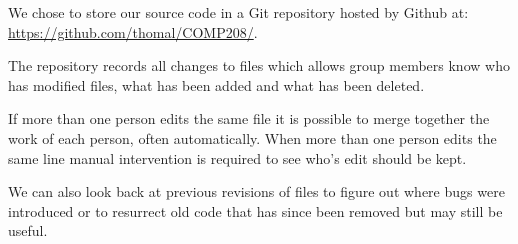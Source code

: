 We chose to store our source code in a Git repository hosted by Github at: 
\url{https://github.com/thomal/COMP208/}. \par

The repository records all changes to files which allows group members know 
who has modified files, what has been added and what has been deleted. \par

If more than one person edits the same file it is possible to merge together 
the work of each person, often automatically. When more than one person edits 
the same line manual intervention is required to see who's edit should be 
kept. \par

We can also look back at previous revisions of files to figure out where bugs 
were introduced or to resurrect old code that has since been removed but may 
still be useful.
